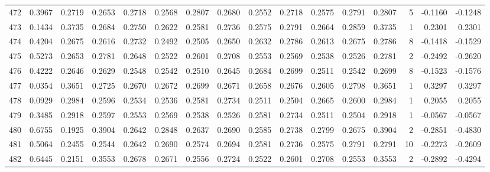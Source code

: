 \begin{tabular}{lrrrrrrrrrrrrrrr}
472 &      0.3967 &  0.2719 &  0.2653 &  0.2718 &  0.2568 &  0.2807 &  0.2680 &  0.2552 &  0.2718 &  0.2575 &   0.2791 &     0.2807 &      5 &                   -0.1160 &                    -0.1248 \\
473 &      0.1434 &  0.3735 &  0.2684 &  0.2750 &  0.2622 &  0.2581 &  0.2736 &  0.2575 &  0.2791 &  0.2664 &   0.2859 &     0.3735 &      1 &                    0.2301 &                     0.2301 \\
474 &      0.4204 &  0.2675 &  0.2616 &  0.2732 &  0.2492 &  0.2505 &  0.2650 &  0.2632 &  0.2786 &  0.2613 &   0.2675 &     0.2786 &      8 &                   -0.1418 &                    -0.1529 \\
475 &      0.5273 &  0.2653 &  0.2781 &  0.2648 &  0.2522 &  0.2601 &  0.2708 &  0.2553 &  0.2569 &  0.2538 &   0.2526 &     0.2781 &      2 &                   -0.2492 &                    -0.2620 \\
476 &      0.4222 &  0.2646 &  0.2629 &  0.2548 &  0.2542 &  0.2510 &  0.2645 &  0.2684 &  0.2699 &  0.2511 &   0.2542 &     0.2699 &      8 &                   -0.1523 &                    -0.1576 \\
477 &      0.0354 &  0.3651 &  0.2725 &  0.2670 &  0.2672 &  0.2699 &  0.2671 &  0.2658 &  0.2676 &  0.2605 &   0.2798 &     0.3651 &      1 &                    0.3297 &                     0.3297 \\
478 &      0.0929 &  0.2984 &  0.2596 &  0.2534 &  0.2536 &  0.2581 &  0.2734 &  0.2511 &  0.2504 &  0.2665 &   0.2600 &     0.2984 &      1 &                    0.2055 &                     0.2055 \\
479 &      0.3485 &  0.2918 &  0.2597 &  0.2553 &  0.2569 &  0.2538 &  0.2526 &  0.2581 &  0.2734 &  0.2511 &   0.2504 &     0.2918 &      1 &                   -0.0567 &                    -0.0567 \\
480 &      0.6755 &  0.1925 &  0.3904 &  0.2642 &  0.2848 &  0.2637 &  0.2690 &  0.2585 &  0.2738 &  0.2799 &   0.2675 &     0.3904 &      2 &                   -0.2851 &                    -0.4830 \\
481 &      0.5064 &  0.2455 &  0.2544 &  0.2642 &  0.2690 &  0.2574 &  0.2694 &  0.2581 &  0.2736 &  0.2575 &   0.2791 &     0.2791 &     10 &                   -0.2273 &                    -0.2609 \\
482 &      0.6445 &  0.2151 &  0.3553 &  0.2678 &  0.2671 &  0.2556 &  0.2724 &  0.2522 &  0.2601 &  0.2708 &   0.2553 &     0.3553 &      2 &                   -0.2892 &                    -0.4294 \\

\end{tabular}
